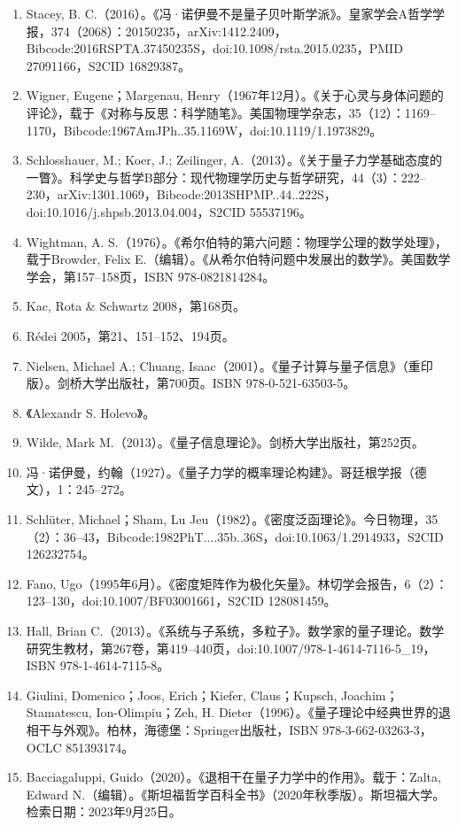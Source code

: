 \begin{enumerate}
\item Stacey, B. C.（2016）。《冯·诺伊曼不是量子贝叶斯学派》。皇家学会A哲学学报，374（2068）：20150235，arXiv:1412.2409，Bibcode:2016RSPTA.37450235S，doi:10.1098/rsta.2015.0235，PMID 27091166，S2CID 16829387。  
\item Wigner, Eugene；Margenau, Henry（1967年12月）。《关于心灵与身体问题的评论》，载于《对称与反思：科学随笔》。美国物理学杂志，35（12）：1169–1170，Bibcode:1967AmJPh..35.1169W，doi:10.1119/1.1973829。  
\item Schlosshauer, M.; Koer, J.; Zeilinger, A.（2013）。《关于量子力学基础态度的一瞥》。科学史与哲学B部分：现代物理学历史与哲学研究，44（3）：222–230，arXiv:1301.1069，Bibcode:2013SHPMP..44..222S，doi:10.1016/j.shpsb.2013.04.004，S2CID 55537196。  
\item Wightman, A. S.（1976）。《希尔伯特的第六问题：物理学公理的数学处理》，载于Browder, Felix E.（编辑）。《从希尔伯特问题中发展出的数学》。美国数学学会，第157–158页，ISBN 978-0821814284。  
\item Kac, Rota & Schwartz 2008，第168页。  
\item Rédei 2005，第21、151–152、194页。  
\item Nielsen, Michael A.; Chuang, Isaac（2001）。《量子计算与量子信息》（重印版）。剑桥大学出版社，第700页。ISBN 978-0-521-63503-5。  
\item 《Alexandr S. Holevo》。  
\item Wilde, Mark M.（2013）。《量子信息理论》。剑桥大学出版社，第252页。  
\item 冯·诺伊曼，约翰（1927）。《量子力学的概率理论构建》。哥廷根学报（德文），1：245–272。  
\item Schlüter, Michael；Sham, Lu Jeu（1982）。《密度泛函理论》。今日物理，35（2）：36–43，Bibcode:1982PhT....35b..36S，doi:10.1063/1.2914933，S2CID 126232754。  
\item Fano, Ugo（1995年6月）。《密度矩阵作为极化矢量》。林切学会报告，6（2）：123–130，doi:10.1007/BF03001661，S2CID 128081459。  
\item Hall, Brian C.（2013）。《系统与子系统，多粒子》。数学家的量子理论。数学研究生教材，第267卷，第419–440页，doi:10.1007/978-1-4614-7116-5_19，ISBN 978-1-4614-7115-8。  
\item Giulini, Domenico；Joos, Erich；Kiefer, Claus；Kupsch, Joachim；Stamatescu, Ion-Olimpiu；Zeh, H. Dieter（1996）。《量子理论中经典世界的退相干与外观》。柏林，海德堡：Springer出版社，ISBN 978-3-662-03263-3，OCLC 851393174。  
\item Bacciagaluppi, Guido（2020）。《退相干在量子力学中的作用》。载于：Zalta, Edward N.（编辑）。《斯坦福哲学百科全书》（2020年秋季版）。斯坦福大学。检索日期：2023年9月25日。

\end{enumerate}
